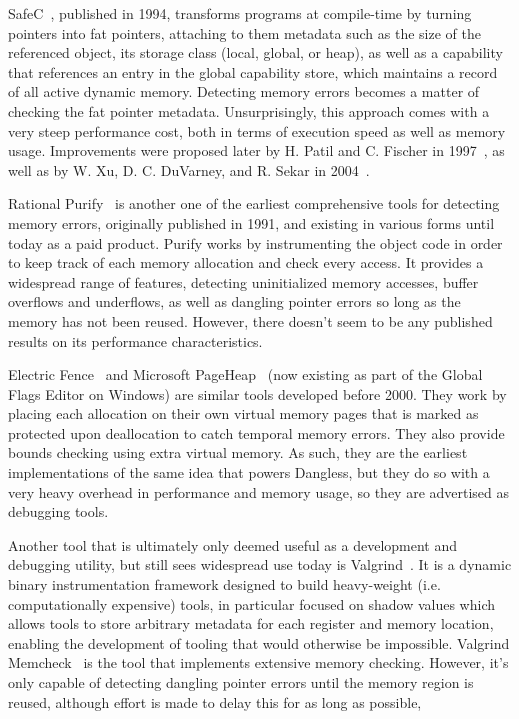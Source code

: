 SafeC~\cite{safec1994}, published in 1994, transforms programs at compile-time by turning pointers into fat pointers, attaching to them metadata such as the size of the referenced object, its storage class (local, global, or heap), as well as a capability that references an entry in the global capability store, which maintains a record of all active dynamic memory. Detecting memory errors becomes a matter of checking the fat pointer metadata. Unsurprisingly, this approach comes with a very steep performance cost, both in terms of execution speed as well as memory usage. Improvements were proposed later by H. Patil and C. Fischer in 1997~\cite{safec-improved1997}, as well as by W. Xu, D. C. DuVarney, and R. Sekar in 2004~\cite{safec-improved2004}.

Rational Purify~\cite{hastings1991purify} is another one of the earliest comprehensive tools for detecting memory errors, originally published in 1991, and existing in various forms until today as a paid product. Purify works by instrumenting the object code in order to keep track of each memory allocation and check every access. It provides a widespread range of features, detecting uninitialized memory accesses, buffer overflows and underflows, as well as dangling pointer errors so long as the memory has not been reused. However, there doesn't seem to be any published results on its performance characteristics.

Electric Fence~\cite{electric-fence} and Microsoft PageHeap~\cite{pageheap} (now existing as part of the Global Flags Editor on Windows) are similar tools developed before 2000. They work by placing each allocation on their own virtual memory pages that is marked as protected upon deallocation to catch temporal memory errors. They also provide bounds checking using extra virtual memory. As such, they are the earliest implementations of the same idea that powers Dangless, but they do so with a very heavy overhead in performance and memory usage, so they are advertised as debugging tools.

Another tool that is ultimately only deemed useful as a development and debugging utility, but still sees widespread use today is Valgrind~\cite{valgrind2007}. It is a dynamic binary instrumentation framework designed to build heavy-weight (i.e. computationally expensive) tools, in particular focused on shadow values which allows tools to store arbitrary metadata for each register and memory location, enabling the development of tooling that would otherwise be impossible. Valgrind Memcheck~\cite{valgrind-memcheck-web} is the tool that implements extensive memory checking. However, it's only capable of detecting dangling pointer errors until the memory region is reused, although effort is made to delay this for as long as possible,


